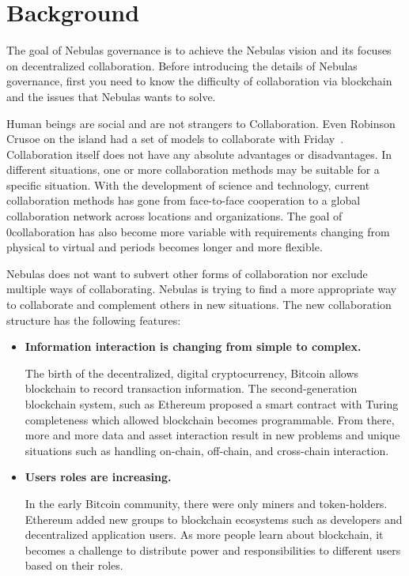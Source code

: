 \section{Background}

The goal of Nebulas governance is to achieve the Nebulas vision and its focuses on decentralized collaboration. Before introducing the details of Nebulas governance, first you need to know the difficulty of collaboration via blockchain and the issues that Nebulas wants to solve.

\label{background}

Human beings are social and are not strangers to Collaboration. Even Robinson Crusoe on the island had a set of models to collaborate with Friday~\cite{robinson}. Collaboration itself does not have any absolute advantages or disadvantages. In different situations, one or more collaboration methods may be suitable for a specific situation. With the development of science and technology, current collaboration methods has gone from face-to-face cooperation to a global collaboration network across locations and organizations. The goal of 0collaboration has also become more variable with requirements changing from physical to virtual and periods becomes longer and more flexible.

Nebulas does not want to subvert other forms of collaboration nor exclude multiple ways of collaborating. Nebulas is trying to find a more appropriate way to collaborate and complement others in new situations. The new collaboration structure has the following features:

\begin{itemize}
	\item \textbf{Information interaction is changing from simple to complex.}

	The birth of the decentralized, digital cryptocurrency, Bitcoin allows blockchain to record transaction information. The second-generation blockchain system, such as Ethereum proposed a smart contract with Turing completeness which allowed blockchain becomes programmable. From there, more and more data and asset interaction result in new problems and unique situations such as handling on-chain, off-chain, and cross-chain interaction.

	\item \textbf{Users roles are increasing.}

	In the early Bitcoin community, there were only miners and token-holders. Ethereum added new groups to blockchain ecosystems such as developers and decentralized application users. As more people learn about blockchain, it becomes a challenge to distribute power and responsibilities to different users based on their roles.

\end{itemize}


